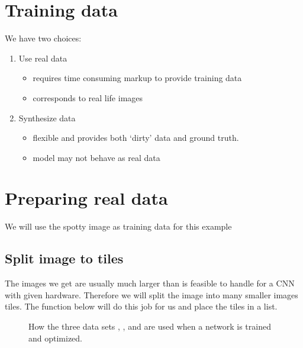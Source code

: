 \documentclass[letterpaper,10pt,english]{sphinxmanual}
\begin{document}
\section{Training data}
\label{\detokenize{ML4NeutronImageSegmentation:training-data}}
We have two choices:
\begin{enumerate}
%
\item {} 
Use real data
\begin{itemize}
\item {} 
requires time consuming markup to provide training data

\item {} 
corresponds to real life images

\end{itemize}

\item {} 
Synthesize data
\begin{itemize}
\item {} 
flexible and provides both ‘dirty’ data and ground truth.

\item {} 
model may not behave as real data

\end{itemize}

\end{enumerate}


\section{Preparing real data}
\label{\detokenize{ML4NeutronImageSegmentation:preparing-real-data}}
We will use the spotty image as training data for this example


\subsection{Split image to tiles}
\label{\detokenize{ML4NeutronImageSegmentation:split-image-to-tiles}}


The images we get are usually much larger than is feasible to handle for a CNN with given hardware. Therefore we will split the image into many smaller images \sphinxhyphen{} tiles. The function below will do this job for us and place the tiles in a list.

\begin{figure}[htbp]
\centering
\capstart

\noindent{}
\caption{How the three data sets , , and  are used when a network is trained and optimized.}\label{\detokenize{ML4NeutronImageSegmentation:id16}}\end{figure}
\end{document}
